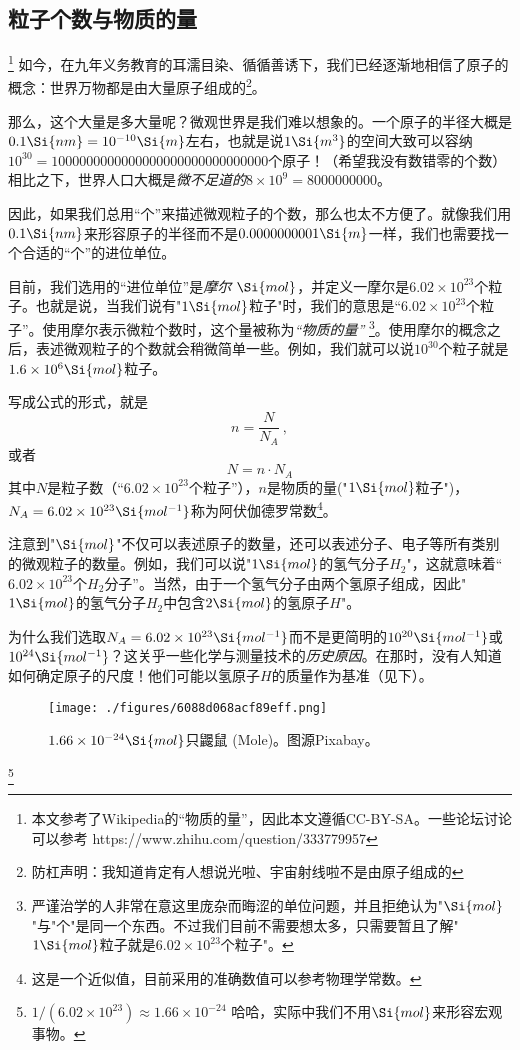 
\subsection{粒子个数与物质的量}
\footnote{本文参考了Wikipedia的“物质的量”，因此本文遵循CC-BY-SA。一些论坛讨论可以参考 https://www.zhihu.com/question/333779957}
如今，在九年义务教育的耳濡目染、循循善诱下，我们已经逐渐地相信了原子的概念：世界万物都是由大量原子组成的\footnote{防杠声明：我知道肯定有人想说光啦、宇宙射线啦不是由原子组成的}。

那么，这个大量是多大量呢？微观世界是我们难以想象的。一个原子的半径大概是$0.1 \Si{nm} = 10^{-10} \Si{m}$左右，也就是说$1 \Si{m^3}$的空间大致可以容纳$10^{30}=1000000000000000000000000000000$个原子！（希望我没有数错零的个数）相比之下，世界人口大概是\textsl{微不足道的}$8\times 10^9=8000000000$。

因此，如果我们总用“个”来描述微观粒子的个数，那么也太不方便了。就像我们用$0.1 \Si{nm}$来形容原子的半径而不是$0.0000000001 \Si{m}$一样，我们也需要找一个合适的“个”的进位单位。

目前，我们选用的“进位单位”是\textsl{摩尔 $\Si{mol}$}，并定义一摩尔是$6.02\times 10^{23}$个粒子。也就是说，当我们说有"$1 \Si{mol}$粒子"时，我们的意思是“$6.02\times 10^{23}$个粒子”。使用摩尔表示微粒个数时，这个量被称为\textsl{“物质的量”} \footnote{严谨治学的人非常在意这里庞杂而晦涩的单位问题，并且拒绝认为"$\Si{mol}$"与"个"是同一个东西。不过我们目前不需要想太多，只需要暂且了解"$1 \Si{mol}$粒子就是$6.02\times 10^{23}$个粒子"。}。使用摩尔的概念之后，表述微观粒子的个数就会稍微简单一些。例如，我们就可以说$10^{30}$个粒子就是$1.6\times 10^6 \Si{mol}$粒子。

写成公式的形式，就是
$$n=\frac{N}{N_A}~,$$
或者
$$N=n \cdot N_A$$
其中$N$是粒子数（“$6.02\times 10^{23}$个粒子”），$n$是物质的量("$1 \Si{mol}$粒子")，$N_A = 6.02\times 10^{23} \Si{mol^{-1}}$称为阿伏伽德罗常数\footnote{这是一个近似值，目前采用的准确数值可以参考物理学常数。}。

注意到"$\Si{mol}$"不仅可以表述原子的数量，还可以表述分子、电子等所有类别的微观粒子的数量。例如，我们可以说"$1\Si{mol}$的氢气分子$H_2$"，这就意味着“$6.02\times 10^{23}$个$H_2$分子”。当然，由于一个氢气分子由两个氢原子组成，因此"$1\Si{mol}$的氢气分子$H_2$中包含$2\Si{mol}$的氢原子$H$"。

为什么我们选取$N_A = 6.02\times 10^{23} \Si{mol^{-1}}$而不是更简明的$10^{20} \Si{mol^{-1}}$或$10^{24} \Si{mol^{-1}}$？这关乎一些化学与测量技术的\textsl{历史原因}。在那时，没有人知道如何确定原子的尺度！他们可能以氢原子$H$的质量作为基准（见下）。
\begin{figure}[ht]
\centering
\texttt{[image: ./figures/6088d068acf89eff.png]}
\caption{$1.66\times10^{-24} \Si{mol}$只鼹鼠 (Mole)。图源Pixabay。} \label{fig_MOLE_1}
\end{figure}\footnote{$1/(6.02\times10^{23}) \approx 1.66\times10^{-24}$ 哈哈，实际中我们不用$\Si{mol}$来形容宏观事物。}

